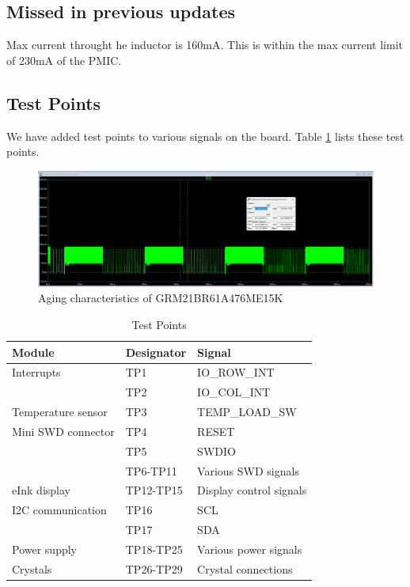 \documentclass[a4paper,11pt]{article}%
\begin{document}
\subsection{Missed in previous updates}
Max current throught he inductor is 160mA. This is within the max current limit of 230mA of the PMIC. 

\subsection{Test Points}

We have added test points to various signals on the board. Table \ref{tab:test_points} lists these test points.
\begin{figure}[H]
    \centering
    \includegraphics[width=\textwidth]{figures/Update5/Max inductor current.png}
    \caption{Aging characteristics of GRM21BR61A476ME15K}
\end{figure}
\begin{table}[H]
    \centering
    \begin{tabular}{|l|l|l|}
        \hline
        \textbf{Module} & \textbf{Designator} & \textbf{Signal} \\
        \hline
        Interrupts & TP1 & IO\_ROW\_INT \\
        & TP2 & IO\_COL\_INT \\
        \hline
        Temperature sensor & TP3 & TEMP\_LOAD\_SW \\
        \hline
        Mini SWD connector & TP4 & RESET \\
        & TP5 & SWDIO \\
        & TP6-TP11 & Various SWD signals \\
        \hline
        eInk display & TP12-TP15 & Display control signals \\
        \hline
        I2C communication & TP16 & SCL \\
        & TP17 & SDA \\
        \hline
        Power supply & TP18-TP25 & Various power signals \\
        \hline
        Crystals & TP26-TP29 & Crystal connections \\
        \hline
    \end{tabular}
    \caption{Test Points}
    \label{tab:test_points}
\end{table}
\end{document}
